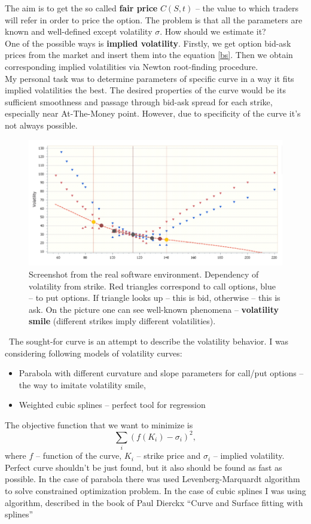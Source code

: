 \documentclass[]{article}
\begin{document}
The aim is to get the so called \textbf{fair price} $C(S, t)$ -- the value to which traders will refer in order to price the option. The problem is that all the parameters are known and well-defined except volatility $\sigma$. How should we estimate it? \\

One of the possible ways is \textbf{implied volatility}. Firstly, we get option bid-ask prices from the market and insert them into the equation \ref{bs}. Then we obtain corresponding implied volatilities via Newton root-finding procedure. \\

My personal task was to determine parameters of specific curve in a way it fits implied volatilities the best.
The desired properties of the curve would be its sufficient smoothness and passage through bid-ask spread for each strike, especially near At-The-Money point. However, due to specificity of the curve it's not always possible. \\
\begin{figure}
\includegraphics[scale=0.5]{iv}
\caption{Screenshot from the real software environment. Dependency of volatility from strike. {\color{red}Red} triangles correspond to call options, {\color{blue}blue}  -- to put options. If triangle looks up -- this is bid, otherwise -- this is ask. On the picture one can see well-known phenomena -- \textbf{volatility smile} (different strikes imply different volatilities).}
\end{figure}
\
The sought-for curve is an attempt to describe the volatility behavior. I was considering following models of volatility curves:
\begin{itemize}
	\item Parabola with different curvature and slope parameters for call/put options -- the way to imitate volatility smile,
	\item Weighted cubic splines -- perfect tool for regression
\end{itemize}
The objective function that we want to minimize is
\[
\sum_i (f(K_i) - \sigma_i)^2,
\]
where $f$ -- function of the curve,  $K_i$ -- strike price and $\sigma_i$ -- implied volatility.
Perfect curve shouldn't be just found, but it also should be found as fast as possible. In the case of parabola there was used Levenberg-Marquardt algorithm to solve constrained optimization problem. In the case of cubic splines I was using algorithm, described in the book of Paul Dierckx ``Curve and Surface fitting with splines'' \\
\end{document}

